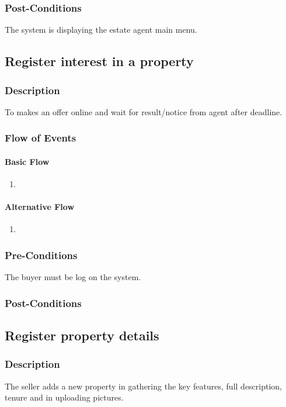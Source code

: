 \documentclass[a4paper,12pt]{article}
\begin{document}
\subsubsection{Post-Conditions}
The system is displaying the estate agent main menu.

\subsection{Register interest in a property}
\subsubsection{Description}
To makes an offer online and wait for result/notice from agent after deadline.
\subsubsection{Flow of Events}
\paragraph{Basic Flow}
\begin{enumerate}
\item
\end{enumerate}
\paragraph{Alternative Flow}
\begin{enumerate}
\item
\end{enumerate}
\subsubsection{Pre-Conditions}
The buyer must be log on the system.
\subsubsection{Post-Conditions}

\subsection{Register property details}
\subsubsection{Description}
The seller adds a new property in gathering the key features, full description, tenure and in uploading pictures.
\end{document}
